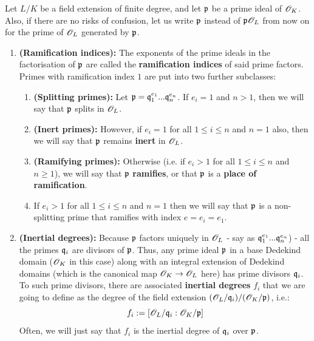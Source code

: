                 \begin{definition} \label{def: ramification_indices}
                    Let $L/K$ be a field extension of finite degree, and let $\mathfrak{p}$ be a prime ideal of $\mathscr{O}_K$. Also, if there are no risks of confusion, let us write $\mathfrak{p}$ instead of $\mathfrak{p}\mathscr{O}_L$ from now on for the prime of $\mathscr{O}_L$ generated by $\mathfrak{p}$.
                        \begin{enumerate}
                            \item \textbf{(Ramification indices):} The exponents of the prime ideals in the factorisation of $\mathfrak{p}$ are called the \textbf{ramification indices} of said prime factors. Primes with ramification index $1$ are put into two further subclasses:
                                \begin{enumerate}
                                    \item \textbf{(Splitting primes):} Let $\mathfrak{p} = \mathfrak{q}_1^{e_1}...\mathfrak{q}_n^{e_n}$. If $e_i = 1$ and $n > 1$, then we will say that $\mathfrak{p}$ splits in $\mathscr{O}_L$.
                                    \item \textbf{(Inert primes):} However, if $e_i = 1$ for all $1 \leq i \leq n$ and $n = 1$ also, then we will say that $\mathfrak{p}$ remains \textbf{inert} in $\mathscr{O}_L$.
                                    \item \textbf{(Ramifying primes):} Otherwise (i.e. if $e_i > 1$ for all $1 \leq i \leq n$ and $n \geq 1$), we will say that $\mathfrak{p}$ \textbf{ramifies}, or that $\mathfrak{p}$ is a \textbf{place of ramification}.
                                    \item If $e_i > 1$ for all $1 \leq i \leq n$ and $n = 1$ then we will say that $\mathfrak{p}$ is a non-splitting prime that ramifies with index $e = e_i = e_1$.
                                \end{enumerate}
                            \item \textbf{(Inertial degrees):} Because $\mathfrak{p}$ factors uniquely in $\mathscr{O}_L$ - say as $\mathfrak{q}_1^{e_1}...\mathfrak{q}_n^{e_n}$) - all the primes $\mathfrak{q}_i$ are divisors of $\mathfrak{p}$. Thus, any prime ideal $\mathfrak{p}$ in a base Dedekind domain ($\mathscr{O}_K$ in this case) along with an integral extension of Dedekind domains (which is the canonical map $\mathscr{O}_K \to \mathscr{O}_L$ here) has prime divisors $\mathfrak{q}_i$. To such prime divisors, there are associated \textbf{inertial degrees} $f_i$ that we are going to define as the degree of the field extension $(\mathscr{O}_L/\mathfrak{q}_i)/(\mathscr{O}_K/\mathfrak{p})$, i.e.:
                                $$f_i := [\mathscr{O}_L/\mathfrak{q}_i : \mathscr{O}_K/\mathfrak{p}]$$
                            Often, we will just say that $f_i$ is the inertial degree of $\mathfrak{q}_i$ over $\mathfrak{p}$.
                        \end{enumerate}
                \end{definition}
                
